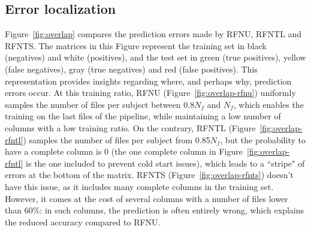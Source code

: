 \documentclass[10pt, conference, compsocconf]{IEEEtran}
\begin{document}
\subsection{Error localization}

Figure~\ref{fig:overlap} compares the prediction errors made by RFNU, 
RFNTL and RFNTS. The matrices in this Figure represent the training set 
in black (negatives) and white (positives), and the test set in green 
(true positives), yellow (false negatives), gray (true negatives) and 
red (false positives). This representation provides insights regarding 
where, and perhaps why, prediction errors 
occur. At this training ratio, RFNU (Figure~\ref{fig:overlap-rfnu}) 
uniformly samples the number of files per subject between 0.8$N_f$ and 
$N_f$, which enables the training on the last 
files of the pipeline, while maintaining a low number of columns with 
a low training ratio. On the contrary, RFNTL 
(Figure~\ref{fig:overlap-rfntl}) samples the number of files per 
subject from 0.85$N_f$, but the probability to have a complete column 
is 0 (the one complete column in Figure~\ref{fig:overlap-rfntl} is the 
one included to prevent cold start issues), which leads to a ``stripe" 
of errors at the bottom of the matrix. RFNTS 
(Figure~\ref{fig:overlap-rfnts}) doesn't have this issue, as it 
includes many complete columns in the training set. However, it comes at 
the cost of several columns with a number of files lower than 
60\%: in such columns, the prediction is often entirely wrong, which explains
the reduced accuracy compared to RFNU.
\end{document}
